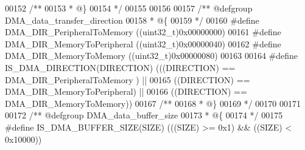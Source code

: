 \begin{DoxyCode}
00152 \textcolor{comment}{/**}
00153 \textcolor{comment}{  * @\}}
00154 \textcolor{comment}{  */}
00155 
00156 
00157 \textcolor{comment}{/** @defgroup DMA\_data\_transfer\_direction }
00158 \textcolor{comment}{  * @\{}
00159 \textcolor{comment}{  */}
00160 \textcolor{preprocessor}{#}\textcolor{preprocessor}{define} \textcolor{preprocessor}{DMA\_DIR\_PeripheralToMemory}        \textcolor{preprocessor}{(}\textcolor{preprocessor}{(}\textcolor{preprocessor}{uint32\_t}\textcolor{preprocessor}{)}0x00000000\textcolor{preprocessor}{)}
00161 \textcolor{preprocessor}{#}\textcolor{preprocessor}{define} \textcolor{preprocessor}{DMA\_DIR\_MemoryToPeripheral}        \textcolor{preprocessor}{(}\textcolor{preprocessor}{(}\textcolor{preprocessor}{uint32\_t}\textcolor{preprocessor}{)}0x00000040\textcolor{preprocessor}{)}
00162 \textcolor{preprocessor}{#}\textcolor{preprocessor}{define} \textcolor{preprocessor}{DMA\_DIR\_MemoryToMemory}            \textcolor{preprocessor}{(}\textcolor{preprocessor}{(}\textcolor{preprocessor}{uint32\_t}\textcolor{preprocessor}{)}0x00000080\textcolor{preprocessor}{)}
00163 
00164 \textcolor{preprocessor}{#}\textcolor{preprocessor}{define} \textcolor{preprocessor}{IS\_DMA\_DIRECTION}\textcolor{preprocessor}{(}\textcolor{preprocessor}{DIRECTION}\textcolor{preprocessor}{)} \textcolor{preprocessor}{(}\textcolor{preprocessor}{(}\textcolor{preprocessor}{(}\textcolor{preprocessor}{DIRECTION}\textcolor{preprocessor}{)} \textcolor{preprocessor}{==} 
      DMA_DIR_PeripheralToMemory \textcolor{preprocessor}{)} \textcolor{preprocessor}{||}
00165                                      \textcolor{preprocessor}{(}\textcolor{preprocessor}{(}\textcolor{preprocessor}{DIRECTION}\textcolor{preprocessor}{)} \textcolor{preprocessor}{==} 
      DMA_DIR_MemoryToPeripheral\textcolor{preprocessor}{)}  \textcolor{preprocessor}{||}
00166                                      \textcolor{preprocessor}{(}\textcolor{preprocessor}{(}\textcolor{preprocessor}{DIRECTION}\textcolor{preprocessor}{)} \textcolor{preprocessor}{==} DMA_DIR_MemoryToMemory\textcolor{preprocessor}{)}\textcolor{preprocessor}{)}
00167 \textcolor{comment}{/**}
00168 \textcolor{comment}{  * @\}}
00169 \textcolor{comment}{  */}
00170 
00171 
00172 \textcolor{comment}{/** @defgroup DMA\_data\_buffer\_size }
00173 \textcolor{comment}{  * @\{}
00174 \textcolor{comment}{  */}
00175 \textcolor{preprocessor}{#}\textcolor{preprocessor}{define} \textcolor{preprocessor}{IS\_DMA\_BUFFER\_SIZE}\textcolor{preprocessor}{(}\textcolor{preprocessor}{SIZE}\textcolor{preprocessor}{)} \textcolor{preprocessor}{(}\textcolor{preprocessor}{(}\textcolor{preprocessor}{(}\textcolor{preprocessor}{SIZE}\textcolor{preprocessor}{)} \textcolor{preprocessor}{>=} 0x1\textcolor{preprocessor}{)} \textcolor{preprocessor}{&&} \textcolor{preprocessor}{(}\textcolor{preprocessor}{(}\textcolor{preprocessor}{SIZE}\textcolor{preprocessor}{)} \textcolor{preprocessor}{<} 0x10000\textcolor{preprocessor}{)}\textcolor{preprocessor}{)}

\end{DoxyCode}

